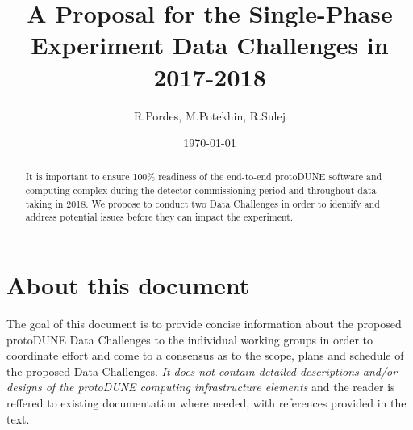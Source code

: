 \documentclass[pdftex,12pt,letter]{article}
\title{A Proposal for the Single-Phase \pd Experiment Data Challenges in 2017-2018}
\date{\today}
\author{R.Pordes, M.Potekhin, R.Sulej}
\newcommand{\pd}{protoDUNE\xspace}
\begin{document}

\maketitle

\begin{abstract}


\noindent It is important to ensure 100\% readiness of the
end-to-end \pd software and computing complex during the detector commissioning period and
throughout data taking in 2018. We propose to conduct two Data Challenges in order to identify
and address potential issues before they can impact the experiment.



\end{abstract}

\tableofcontents

\pagebreak

\section{About this document}

The goal of this document is to provide concise information about the proposed \pd Data Challenges
to the individual working groups in order to coordinate effort and come to a consensus as to the scope,
plans and schedule of the proposed Data Challenges. \textit{It does not contain detailed descriptions
and/or designs of the \pd computing
infrastructure elements} and the reader is reffered to existing documentation where
needed, with references provided in the text.
\end{document}
